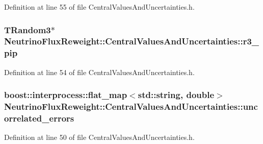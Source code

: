 Definition at line 55 of file Central\-Values\-And\-Uncertainties.\-h.

\hypertarget{class_neutrino_flux_reweight_1_1_central_values_and_uncertainties_a040a7398532acbccd50713e1736012bd}{
\subsubsection[{r3\-\_\-pip}]{\setlength{\rightskip}{0pt plus 5cm}T\-Random3$\ast$ Neutrino\-Flux\-Reweight\-::\-Central\-Values\-And\-Uncertainties\-::r3\-\_\-pip\hspace{0.3cm}{\ttfamily [private]}}}\label{class_neutrino_flux_reweight_1_1_central_values_and_uncertainties_a040a7398532acbccd50713e1736012bd}


Definition at line 54 of file Central\-Values\-And\-Uncertainties.\-h.

\hypertarget{class_neutrino_flux_reweight_1_1_central_values_and_uncertainties_a0c8b32122be01f7f29117a17f5c43ad7}{
\subsubsection[{uncorrelated\-\_\-errors}]{\setlength{\rightskip}{0pt plus 5cm}boost\-::interprocess\-::flat\-\_\-map$<$std\-::string, double$>$ Neutrino\-Flux\-Reweight\-::\-Central\-Values\-And\-Uncertainties\-::uncorrelated\-\_\-errors\hspace{0.3cm}{\ttfamily [private]}}}\label{class_neutrino_flux_reweight_1_1_central_values_and_uncertainties_a0c8b32122be01f7f29117a17f5c43ad7}


Definition at line 50 of file Central\-Values\-And\-Uncertainties.\-h.

